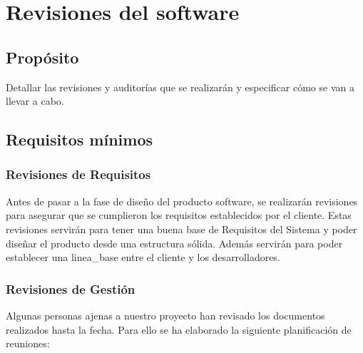 \documentclass[11pt, a4paper, twoside, titlepage]{article}
\begin{document}
	\section{Revisiones del software} %

		\subsection{Propósito}
			Detallar las revisiones y auditorías que se realizarán y especificar cómo se van a llevar a cabo.

		\subsection{Requisitos mínimos}
			\subsubsection{Revisiones de Requisitos}
				Antes de pasar a la fase de diseño del producto software, se realizarán revisiones para asegurar que se cumplieron los requisitos establecidos por el cliente. Estas revisiones servirán para tener una buena base de Requisitos del Sistema y poder diseñar el producto desde una estructura sólida.
 Además servirán para poder establecer una \gls{linea_base} entre el cliente y los desarrolladores. 
				
			\subsubsection{Revisiones de Gestión}
			Algunas personas ajenas a nuestro proyecto han revisado los documentos realizados hasta la fecha. Para ello se ha elaborado la siguiente planificación de reuniones: \\
			
\end{document}
